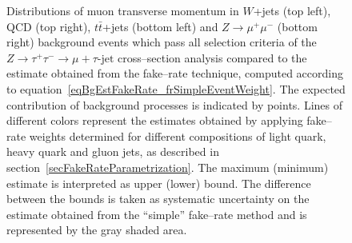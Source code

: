 \begin{figure}[t]
\begin{center}
\begin{picture}
\end{picture}
\caption{\captiontext Distributions of muon transverse momentum in
         $W$+jets (top left), QCD (top right), $t\bar{t}$+jets (bottom left) 
         and $Z \rightarrow \mu^{+} \mu^{-}$ (bottom right) background events which pass all selection criteria 
         of the $Z \rightarrow \tau^{+} \tau^{-} \rightarrow \mu + \tau\mbox{-jet}$ cross--section analysis
	 compared to the estimate obtained from the fake--rate technique, 
         computed according to equation~\ref{eqBgEstFakeRate_frSimpleEventWeight}.
	 The expected contribution of background processes is indicated by points.
	 Lines of different colors represent the estimates obtained by applying 
         fake--rate weights determined for different compositions of light quark, heavy quark and gluon jets,
         as described in section~\ref{secFakeRateParametrization}.
	 The maximum (minimum) estimate is interpreted as upper (lower) bound.
	 The difference between the bounds is taken as systematic uncertainty on the estimate 
         obtained from the ``simple'' fake--rate method and is represented by the gray shaded area.}
\label{figBgEstFakeRate_frSimpleResults_muonPt}
\end{center}
\end{figure} 

